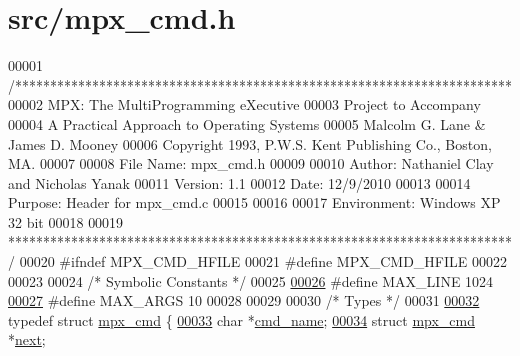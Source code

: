 \hypertarget{mpx__cmd_8h_source}{
\section{src/mpx\_\-cmd.h}
}

\begin{DoxyCode}
00001 \textcolor{comment}{/***********************************************************************}
00002 \textcolor{comment}{        MPX: The MultiProgramming eXecutive}
00003 \textcolor{comment}{        Project to Accompany}
00004 \textcolor{comment}{        A Practical Approach to Operating Systems}
00005 \textcolor{comment}{        Malcolm G. Lane & James D. Mooney}
00006 \textcolor{comment}{        Copyright 1993, P.W.S. Kent Publishing Co., Boston, MA.}
00007 \textcolor{comment}{}
00008 \textcolor{comment}{        File Name:      mpx\_cmd.h}
00009 \textcolor{comment}{}
00010 \textcolor{comment}{        Author: Nathaniel Clay and Nicholas Yanak}
00011 \textcolor{comment}{        Version: 1.1}
00012 \textcolor{comment}{        Date:  12/9/2010}
00013 \textcolor{comment}{}
00014 \textcolor{comment}{        Purpose: Header for mpx\_cmd.c}
00015 \textcolor{comment}{}
00016 \textcolor{comment}{                }
00017 \textcolor{comment}{        Environment: Windows XP 32 bit}
00018 \textcolor{comment}{}
00019 \textcolor{comment}{************************************************************************/}
00020 \textcolor{preprocessor}{#ifndef MPX\_CMD\_HFILE}
00021 \textcolor{preprocessor}{}\textcolor{preprocessor}{#define MPX\_CMD\_HFILE}
00022 \textcolor{preprocessor}{}
00023 
00024 \textcolor{comment}{/* Symbolic Constants */} 
00025 
\hypertarget{mpx__cmd_8h_source_l00026}{}\hyperlink{mpx__cmd_8h_a842ed03f27719bc87666bfd1f75415b8}{00026} \textcolor{preprocessor}{#define MAX\_LINE        1024}
\hypertarget{mpx__cmd_8h_source_l00027}{}\hyperlink{mpx__cmd_8h_a29b7451465deac204c5f7cb1f9c6e1fc}{00027} \textcolor{preprocessor}{}\textcolor{preprocessor}{#define MAX\_ARGS        10}
00028 \textcolor{preprocessor}{}
00029 
00030 \textcolor{comment}{/* Types */}
00031 
\hypertarget{mpx__cmd_8h_source_l00032}{}\hyperlink{structmpx__cmd}{00032} \textcolor{keyword}{typedef} \textcolor{keyword}{struct }\hyperlink{structmpx__cmd}{mpx_cmd} \{
\hypertarget{mpx__cmd_8h_source_l00033}{}\hyperlink{structmpx__cmd_aeae73296151ffcec319820f4d8399e51}{00033}         \textcolor{keywordtype}{char} *\hyperlink{structmpx__cmd_aeae73296151ffcec319820f4d8399e51}{cmd_name};
\hypertarget{mpx__cmd_8h_source_l00034}{}\hyperlink{structmpx__cmd_a863c991d0d31b283791615b5f5fe03bb}{00034}         \textcolor{keyword}{struct }\hyperlink{structmpx__cmd}{mpx_cmd} *\hyperlink{structmpx__cmd_a863c991d0d31b283791615b5f5fe03bb}{next};

\end{DoxyCode}
